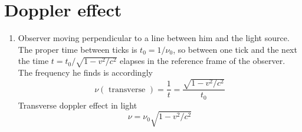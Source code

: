 \begin{center}
\end{center}
\section{Doppler effect}
\begin{enumerate}
	\item  Observer moving perpendicular to a line between him and the light source. The proper time between ticks is $t_{0}=1 / \nu_{0}$, so between one tick and the next the time $t=t_{0} / \sqrt{1-v^{2} / c^{2}}$ elapses in the reference frame of the observer. The frequency he finds is accordingly
	$$
	\nu(\text { transverse })=\frac{1}{t}=\frac{\sqrt{1-v^{2} / c^{2}}}{t_{0}}
	$$
	Transverse 	doppler effect
	in light
	$$
	\nu=\nu_{0} \sqrt{1-v^{2} / c^{2}}
	$$


\end{enumerate}
